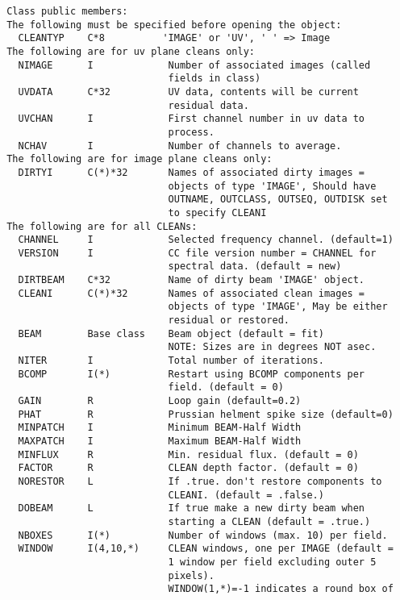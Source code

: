 {\small\begin{verbatim}
 Class public members:
 The following must be specified before opening the object:
   CLEANTYP    C*8          'IMAGE' or 'UV', ' ' => Image
 The following are for uv plane cleans only:
   NIMAGE      I             Number of associated images (called
                             fields in class)
   UVDATA      C*32          UV data, contents will be current
                             residual data.
   UVCHAN      I             First channel number in uv data to
                             process.
   NCHAV       I             Number of channels to average.
 The following are for image plane cleans only:
   DIRTYI      C(*)*32       Names of associated dirty images =
                             objects of type 'IMAGE', Should have
                             OUTNAME, OUTCLASS, OUTSEQ, OUTDISK set
                             to specify CLEANI
 The following are for all CLEANs:
   CHANNEL     I             Selected frequency channel. (default=1)
   VERSION     I             CC file version number = CHANNEL for
                             spectral data. (default = new)
   DIRTBEAM    C*32          Name of dirty beam 'IMAGE' object.
   CLEANI      C(*)*32       Names of associated clean images =
                             objects of type 'IMAGE', May be either
                             residual or restored.
   BEAM        Base class    Beam object (default = fit)
                             NOTE: Sizes are in degrees NOT asec.
   NITER       I             Total number of iterations.
   BCOMP       I(*)          Restart using BCOMP components per
                             field. (default = 0)
   GAIN        R             Loop gain (default=0.2)
   PHAT        R             Prussian helment spike size (default=0)
   MINPATCH    I             Minimum BEAM-Half Width
   MAXPATCH    I             Maximum BEAM-Half Width
   MINFLUX     R             Min. residual flux. (default = 0)
   FACTOR      R             CLEAN depth factor. (default = 0)
   NORESTOR    L             If .true. don't restore components to
                             CLEANI. (default = .false.)
   DOBEAM      L             If true make a new dirty beam when
                             starting a CLEAN (default = .true.)
   NBOXES      I(*)          Number of windows (max. 10) per field.
   WINDOW      I(4,10,*)     CLEAN windows, one per IMAGE (default =
                             1 window per field excluding outer 5
                             pixels).
                             WINDOW(1,*)=-1 indicates a round box of

\end{verbatim}}

